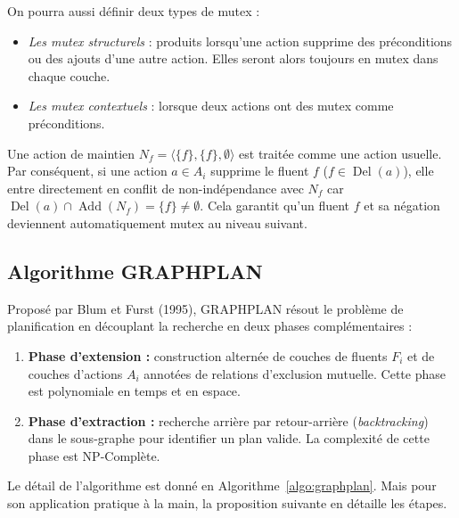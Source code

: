 On pourra aussi définir deux types de mutex : 
\begin{itemize}
    \item \emph{Les mutex structurels} : produits lorsqu'une action supprime des préconditions ou des ajouts d'une autre action. Elles seront alors toujours en mutex dans chaque couche. 
    \item \emph{Les mutex contextuels} : lorsque deux actions ont des mutex comme préconditions. 
\end{itemize}

\begin{remark}
    Une action de maintien $N_f = \langle \{f\}, \{f\}, \emptyset \rangle$ est traitée comme une action usuelle. Par conséquent, si une action $a \in A_i$ supprime le fluent $f$ ($f \in \operatorname{Del}(a)$), elle entre directement en conflit de non-indépendance avec $N_f$ car $\operatorname{Del}(a) \cap \operatorname{Add}(N_f) = \{f\} \neq \emptyset$. Cela garantit qu'un fluent $f$ et sa négation deviennent automatiquement mutex au niveau suivant.
\end{remark}

\subsection{Algorithme GRAPHPLAN}

Proposé par Blum et Furst (1995), GRAPHPLAN résout le problème de planification en découplant la recherche en deux phases complémentaires :
\begin{enumerate}
    \item \textbf{Phase d'extension :} construction alternée de couches de fluents $F_i$ et de couches d'actions $A_i$ annotées de relations d'exclusion mutuelle. Cette phase est polynomiale en temps et en espace. 
    \item \textbf{Phase d'extraction :} recherche arrière par retour-arrière (\emph{backtracking}) dans le sous-graphe pour identifier un plan valide. La complexité de cette phase est NP-Complète. 
\end{enumerate}
Le détail de l'algorithme est donné en Algorithme~\ref{algo:graphplan}. Mais pour son application pratique à la main, la proposition suivante en détaille les étapes. 

